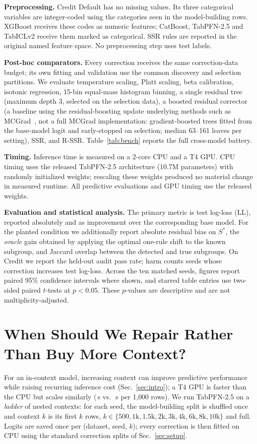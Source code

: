 \documentclass[conference]{IEEEtran}
\begin{document}
\textbf{Preprocessing.} Credit Default has no missing values. Its three categorical variables are
integer-coded using the categories seen in the model-building rows. XGBoost receives these codes as
numeric features; CatBoost, TabPFN-2.5 and TabICLv2 receive them marked as categorical. SSR rules
are reported in the original named feature space. No preprocessing step uses test labels.

\textbf{Post-hoc comparators.} Every correction receives the same correction-data budget; its own
fitting and validation use the common discovery and selection partitions. We evaluate temperature
scaling, Platt scaling, beta calibration, isotonic regression, 15-bin equal-mass histogram binning,
a single residual tree (maximum depth 3, selected on the selection data), a boosted residual
corrector (a baseline using the residual-boosting update underlying methods such as
MCGrad~\cite{tax2026mcgrad}, not a full MCGrad implementation: gradient-boosted trees fitted from the base-model logit and
early-stopped on selection; median 63--161 leaves per setting), SSR, and R-SSR. Table~\ref{tab:bench} reports the full cross-model battery.

\textbf{Timing.} Inference time is measured on a 2-core CPU and a T4 GPU. CPU timing uses the released TabPFN-2.5 architecture (10.7M parameters) with randomly initialized weights; rescaling these weights produced no material change in measured runtime. All predictive evaluations and GPU timing use the released weights.

\textbf{Evaluation and statistical analysis.} The primary metric is test log-loss (LL), reported
absolutely and as improvement over the corresponding base model. For the planted condition
we additionally report absolute residual bias on $S^*$, the \emph{oracle} gain obtained by applying
the optimal one-rule shift to the known subgroup, and Jaccard overlap between the detected and true
subgroups. On Credit we report the held-out audit pass rate; harm counts seeds whose
correction increases test log-loss. Across the ten matched seeds, figures report paired 95\%
confidence intervals where shown, and starred table entries use two-sided paired $t$-tests at
$p<0.05$. These $p$-values are descriptive and are not multiplicity-adjusted.
\section{When Should We Repair Rather Than Buy More Context?}\label{sec:ladder}
For an in-context model, increasing context can improve predictive performance while raising
recurring inference cost (Sec.~\ref{sec:intro}); a T4 GPU is faster than the CPU but scales similarly
(\GpuSecOne\,s vs.\ \GpuSecFull\,s per 1{,}000 rows). We run TabPFN-2.5 on a \emph{ladder} of nested contexts: for each seed,
the model-building split is shuffled once and context $k$ is its first $k$ rows,
$k\in\{500,1\text{k},1.5\text{k},2\text{k},3\text{k},4\text{k},6\text{k},8\text{k},10\text{k}\}$
and full. Logits are saved once per (dataset, seed, $k$); every correction is then fitted on CPU
using the standard correction splits of Sec.~\ref{sec:setup}.
\end{document}
